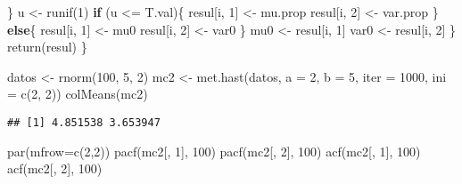 \documentclass[
  12pt,
  spanish,
]{book}
\newenvironment{Shaded}{\begin{snugshade}}{\end{snugshade}}
\newcommand{\AttributeTok}[1]{\textcolor[rgb]{0.77,0.63,0.00}{#1}}
\newcommand{\ControlFlowTok}[1]{\textcolor[rgb]{0.13,0.29,0.53}{\textbf{#1}}}
\newcommand{\DecValTok}[1]{\textcolor[rgb]{0.00,0.00,0.81}{#1}}
\newcommand{\FunctionTok}[1]{\textcolor[rgb]{0.00,0.00,0.00}{#1}}
\newcommand{\NormalTok}[1]{#1}
\newcommand{\OtherTok}[1]{\textcolor[rgb]{0.56,0.35,0.01}{#1}}
\newcommand{\SpecialCharTok}[1]{\textcolor[rgb]{0.00,0.00,0.00}{#1}}
\theoremstyle{definition}
\theoremstyle{definition}
\theoremstyle{definition}
\theoremstyle{definition}
\theoremstyle{remark}
\begin{document}
\begin{Shaded}
\begin{Highlighting}[]
\NormalTok{    \}}
\NormalTok{    u }\OtherTok{\textless{}{-}} \FunctionTok{runif}\NormalTok{(}\DecValTok{1}\NormalTok{) }
    \ControlFlowTok{if}\NormalTok{ (u }\SpecialCharTok{\textless{}=}\NormalTok{ T.val)\{}
\NormalTok{      resul[i, }\DecValTok{1}\NormalTok{] }\OtherTok{\textless{}{-}}\NormalTok{ mu.prop}
\NormalTok{      resul[i, }\DecValTok{2}\NormalTok{] }\OtherTok{\textless{}{-}}\NormalTok{ var.prop}
\NormalTok{      \} }
    \ControlFlowTok{else}\NormalTok{\{}
\NormalTok{      resul[i, }\DecValTok{1}\NormalTok{] }\OtherTok{\textless{}{-}}\NormalTok{ mu0}
\NormalTok{      resul[i, }\DecValTok{2}\NormalTok{] }\OtherTok{\textless{}{-}}\NormalTok{ var0}
\NormalTok{      \}}
\NormalTok{    mu0 }\OtherTok{\textless{}{-}}\NormalTok{ resul[i, }\DecValTok{1}\NormalTok{]}
\NormalTok{    var0 }\OtherTok{\textless{}{-}}\NormalTok{ resul[i, }\DecValTok{2}\NormalTok{]}
\NormalTok{  \}}
  \FunctionTok{return}\NormalTok{(resul)}
\NormalTok{\}}

\NormalTok{datos }\OtherTok{\textless{}{-}} \FunctionTok{rnorm}\NormalTok{(}\DecValTok{100}\NormalTok{, }\DecValTok{5}\NormalTok{, }\DecValTok{2}\NormalTok{)}
\NormalTok{mc2 }\OtherTok{\textless{}{-}} \FunctionTok{met.hast}\NormalTok{(datos, }\AttributeTok{a =} \DecValTok{2}\NormalTok{, }\AttributeTok{b =} \DecValTok{5}\NormalTok{, }
                \AttributeTok{iter =} \DecValTok{1000}\NormalTok{, }\AttributeTok{ini =} \FunctionTok{c}\NormalTok{(}\DecValTok{2}\NormalTok{, }\DecValTok{2}\NormalTok{))}
\FunctionTok{colMeans}\NormalTok{(mc2)}
\end{Highlighting}
\end{Shaded}

\begin{verbatim}
## [1] 4.851538 3.653947
\end{verbatim}

\begin{Shaded}
\begin{Highlighting}[]
\FunctionTok{par}\NormalTok{(}\AttributeTok{mfrow=}\FunctionTok{c}\NormalTok{(}\DecValTok{2}\NormalTok{,}\DecValTok{2}\NormalTok{))}
\FunctionTok{pacf}\NormalTok{(mc2[, }\DecValTok{1}\NormalTok{], }\DecValTok{100}\NormalTok{)}
\FunctionTok{pacf}\NormalTok{(mc2[, }\DecValTok{2}\NormalTok{], }\DecValTok{100}\NormalTok{)}
\FunctionTok{acf}\NormalTok{(mc2[, }\DecValTok{1}\NormalTok{], }\DecValTok{100}\NormalTok{)}
\FunctionTok{acf}\NormalTok{(mc2[, }\DecValTok{2}\NormalTok{], }\DecValTok{100}\NormalTok{)}
\end{Highlighting}
\end{Shaded}
\end{document}
